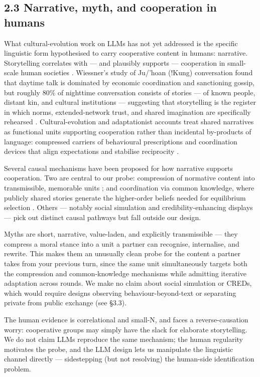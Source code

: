 \documentclass[10pt,letterpaper]{article}
\begin{document}
\subsection{2.3 Narrative, myth, and cooperation in
humans}\label{narrative-myth-and-cooperation-in-humans}

What cultural-evolution work on LLMs has not yet addressed is the
specific linguistic form hypothesised to carry cooperative content in
humans: narrative. Storytelling correlates with --- and plausibly
supports --- cooperation in small-scale human societies \citep{smith2017}. Wiessner's study of Ju/'hoan (!Kung) conversation found that
daytime talk is dominated by economic coordination and sanctioning
gossip, but roughly 80\% of nighttime conversation consists of stories
--- of known people, distant kin, and cultural institutions ---
suggesting that storytelling is the register in which norms,
extended-network trust, and shared imagination are specifically
rehearsed \citep{wiessner2014}. Cultural-evolution and adaptationist
accounts treat shared narratives as functional units supporting
cooperation rather than incidental by-products of language: compressed
carriers of behavioural prescriptions and coordination devices that
align expectations and stabilise reciprocity \citep{bietti2019, boyd2011, henrich2016, sugiyama2001}.

Several causal mechanisms have been proposed for how narrative supports
cooperation. Two are central to our probe: compression of normative
content into transmissible, memorable units \citep{boyd2011, henrich2016}; and coordination via common knowledge, where publicly
shared stories generate the higher-order beliefs needed for equilibrium
selection \citep{chwe2001}. Others --- notably social simulation \citep{maroatley2008} and credibility-enhancing displays \citep{henrich2009} --- pick out distinct causal pathways but fall outside our
design.

Myths are short, narrative, value-laden, and explicitly transmissible
--- they compress a moral stance into a unit a partner can recognise,
internalise, and rewrite. This makes them an unusually clean probe for
the content a partner takes from your previous turn, since the same unit
simultaneously targets both the compression and common-knowledge
mechanisms while admitting iterative adaptation across rounds. We make
no claim about social simulation or CREDs, which would require designs
observing behaviour-beyond-text or separating private from public
exchange (see §3.3).

The human evidence is correlational and small-N, and faces a
reverse-causation worry: cooperative groups may simply have the slack
for elaborate storytelling. We do not claim LLMs reproduce the same
mechanism; the human regularity motivates the probe, and the LLM design
lets us manipulate the linguistic channel directly --- sidestepping (but
not resolving) the human-side identification problem.
\end{document}
